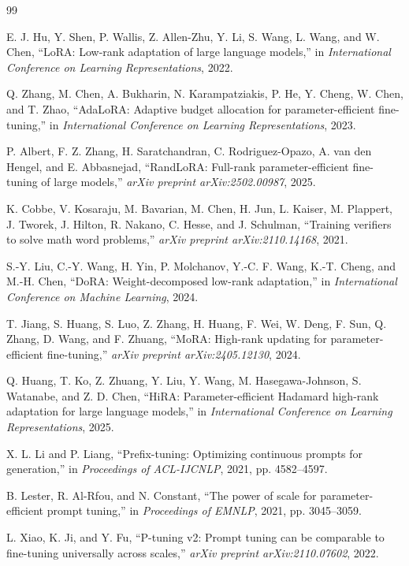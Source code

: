 ﻿\documentclass[UTF8,a4paper,11pt]{ctexart}
\begin{document}
\begin{thebibliography}{99}

E. J. Hu, Y. Shen, P. Wallis, Z. Allen-Zhu, Y. Li, S. Wang, L. Wang, and W. Chen, ``LoRA: Low-rank adaptation of large language models,'' in \emph{International Conference on Learning Representations}, 2022.

Q. Zhang, M. Chen, A. Bukharin, N. Karampatziakis, P. He, Y. Cheng, W. Chen, and T. Zhao, ``AdaLoRA: Adaptive budget allocation for parameter-efficient fine-tuning,'' in \emph{International Conference on Learning Representations}, 2023.

P. Albert, F. Z. Zhang, H. Saratchandran, C. Rodriguez-Opazo, A. van den Hengel, and E. Abbasnejad, ``RandLoRA: Full-rank parameter-efficient fine-tuning of large models,'' \emph{arXiv preprint arXiv:2502.00987}, 2025.

K. Cobbe, V. Kosaraju, M. Bavarian, M. Chen, H. Jun, L. Kaiser, M. Plappert, J. Tworek, J. Hilton, R. Nakano, C. Hesse, and J. Schulman, ``Training verifiers to solve math word problems,'' \emph{arXiv preprint arXiv:2110.14168}, 2021.

S.-Y. Liu, C.-Y. Wang, H. Yin, P. Molchanov, Y.-C. F. Wang, K.-T. Cheng, and M.-H. Chen, ``DoRA: Weight-decomposed low-rank adaptation,'' in \emph{International Conference on Machine Learning}, 2024.

T. Jiang, S. Huang, S. Luo, Z. Zhang, H. Huang, F. Wei, W. Deng, F. Sun, Q. Zhang, D. Wang, and F. Zhuang, ``MoRA: High-rank updating for parameter-efficient fine-tuning,'' \emph{arXiv preprint arXiv:2405.12130}, 2024.

Q. Huang, T. Ko, Z. Zhuang, Y. Liu, Y. Wang, M. Hasegawa-Johnson, S. Watanabe, and Z. D. Chen, ``HiRA: Parameter-efficient Hadamard high-rank adaptation for large language models,'' in \emph{International Conference on Learning Representations}, 2025.

X. L. Li and P. Liang, ``Prefix-tuning: Optimizing continuous prompts for generation,'' in \emph{Proceedings of ACL-IJCNLP}, 2021, pp. 4582--4597.

B. Lester, R. Al-Rfou, and N. Constant, ``The power of scale for parameter-efficient prompt tuning,'' in \emph{Proceedings of EMNLP}, 2021, pp. 3045--3059.

L. Xiao, K. Ji, and Y. Fu, ``P-tuning v2: Prompt tuning can be comparable to fine-tuning universally across scales,'' \emph{arXiv preprint arXiv:2110.07602}, 2022.


\end{thebibliography}
\end{document}
